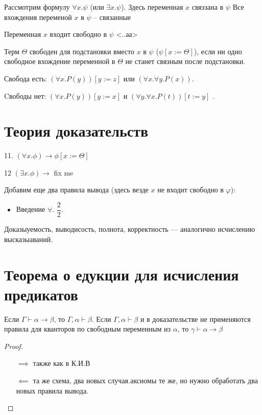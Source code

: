 \begin{definition}
    Рассмотрим формулу $\forall x.\psi$ (или $\exists x.\psi$). Здесь переменная $x$ связзана в $\psi$ Все вхождения переменой $x$ в $\psi$ -- связанные
\end{definition}
\begin{definition}
    Переменная $x$ входит свободно в $\psi$ <..аа>
\end{definition}


\begin{definition}
    Терм $\Theta$ свободен для подстановки вместо $x$ в $\psi$ ($\psi [x:=\Theta]$), если ни одно свободное вхождение переменной в $\Theta$ не станет связным после подстановки.
\end{definition}
Свобода есть: $(\forall x. P(y)) [y:=z]$ или $(\forall x. \forall y. P(x))$.

Cвободы нет: $(\forall x.P(y))[y:=x]$ и $(\forall y.\forall x.P(t))[t:=y]$   .

\section{Теория доказательств}

11. $(\forall x . \phi) \to \phi [x := \Theta]$

12 $(\exists x . \phi) \to $ fix me

Добавим еще два правила вывода (здесь везде $x$ не входит свободно в $\varphi$):
\begin{itemize}
    \item Введение $\forall$. $\dfrac{2}{2}$.
\end{itemize}

\begin{definition}
    Доказыуемость, выводисость, полнота, корректность --- аналогично исчислению высказыаваний.
\end{definition}


\section{Теорема о едукции для исчисления предикатов}

\begin{theorem}
    Если    $\Gamma \vdash \alpha \to \beta$, то $\Gamma, \alpha \vdash \beta$.
    Если $\Gamma, \alpha\vdash \beta$ и в доказательстве не применяются правила для кванторов по свободным переменным из $\alpha$, то $\gamma\vdash \alpha \to \beta$
\end{theorem}
\begin{proof}
    \begin{itemize}
        \item []
        \item [$\implies $] также как в К.И.В
        \item [$\impliedby $] та же схема, два новых случая.аксиомы те же, но нужно обработать два новых правила вывода.
    \end{itemize}
\end{proof}

